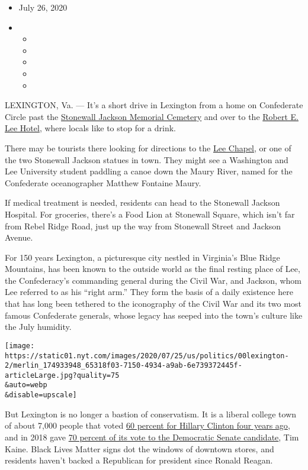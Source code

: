 \begin{itemize}
\item
  July 26, 2020
\item
  \begin{itemize}
  \item
  \item
  \item
  \item
  \item
  \end{itemize}
\end{itemize}

LEXINGTON, Va. --- It's a short drive in Lexington from a home on
Confederate Circle past the
\href{https://lexingtonvirginia.com/directory/attractions/stonewall-jackson-memorial-cemetery}{Stonewall
Jackson Memorial Cemetery} and over to the
\href{https://roberteleehotel.com/}{Robert E. Lee Hotel}, where locals
like to stop for a drink.

There may be tourists there looking for directions to the
\href{https://my.wlu.edu/lee-chapel-and-museum}{Lee Chapel}, or one of
the two Stonewall Jackson statues in town. They might see a Washington
and Lee University student paddling a canoe down the Maury River, named
for the Confederate oceanographer Matthew Fontaine Maury.

If medical treatment is needed, residents can head to the Stonewall
Jackson Hospital. For groceries, there's a Food Lion at Stonewall
Square, which isn't far from Rebel Ridge Road, just up the way from
Stonewall Street and Jackson Avenue.

For 150 years Lexington, a picturesque city nestled in Virginia's Blue
Ridge Mountains, has been known to the outside world as the final
resting place of Lee, the Confederacy's commanding general during the
Civil War, and Jackson, whom Lee referred to as his ``right arm.'' They
form the basis of a daily existence here that has long been tethered to
the iconography of the Civil War and its two most famous Confederate
generals, whose legacy has seeped into the town's culture like the July
humidity.

\texttt{[image: https://static01.nyt.com/images/2020/07/25/us/politics/00lexington-2/merlin\_174933948\_65318f03-7150-4934-a9ab-6e739372445f-articleLarge.jpg?quality=75\\\&auto=webp\\\&disable=upscale]}

But Lexington is no longer a bastion of conservatism. It is a liberal
college town of about 7,000 people that voted
\href{https://www.nytimes.com/elections/2016/results/virginia}{60
percent for Hillary Clinton four years ago}, and in 2018 gave
\href{https://www.nytimes.com/elections/results/virginia-senate}{70
percent of its vote to the Democratic Senate candidate}, Tim Kaine.
Black Lives Matter signs dot the windows of downtown stores, and
residents haven't backed a Republican for president since Ronald Reagan.

